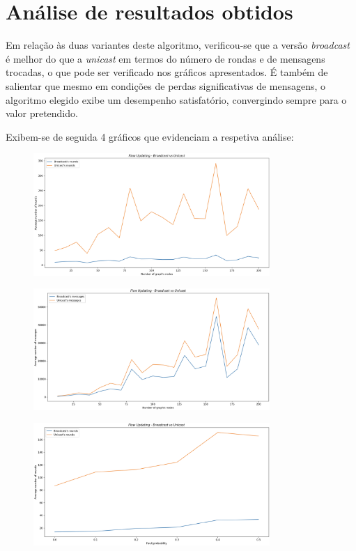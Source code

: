 \documentclass[a4paper]{report}
\begin{document}
{\let\clearpage\relax \chapter{Análise de resultados obtidos} \label{ch:Analysis of results}}
\large{
	Em relação às duas variantes deste algoritmo, verificou-se que a versão \textit{broadcast} é melhor do que a \textit{unicast} em termos do número de rondas e de mensagens trocadas, o que pode ser verificado nos gráficos apresentados.
	É também de salientar que mesmo em condições de perdas significativas de mensagens, o algoritmo elegido exibe um desempenho satisfatório, convergindo sempre para o valor pretendido.

	Exibem-se de seguida 4 gráficos que evidenciam a respetiva análise:
	\begin{figure}[H]
		\centering
		\includegraphics[width=0.8\textwidth]{Images/Plot1.png}
		\label{fig:1}
	\end{figure}
	
	\begin{figure}[H]
		\centering
		\includegraphics[width=0.8\textwidth]{Images/Plot2.png}
		\label{fig:2}
	\end{figure}

	\begin{figure}[H]
		\centering
		\includegraphics[width=0.8\textwidth]{Images/Plot3.png}
		\label{fig:3}
	\end{figure}

}
\end{document}
